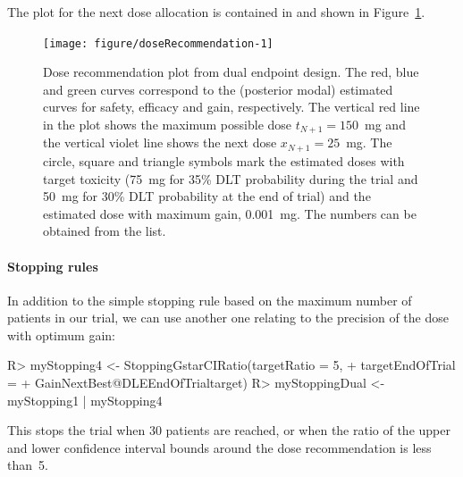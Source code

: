 \documentclass[article]{jss}\usepackage[]{graphicx}\usepackage[]{color}
\begin{document}
The plot for the next dose allocation is contained in  and shown in Figure~\ref{fig:doseRecommendation}.
\begin{figure}
\begin{Schunk}


{\centering \texttt{[image: figure/doseRecommendation-1]} 

}

\end{Schunk}
\caption{Dose recommendation plot from dual endpoint design. The red, blue and green curves correspond to the (posterior modal) estimated curves for safety, efficacy and gain, respectively. The vertical red line in the plot shows the maximum possible dose $t_{N+1} = 150$~mg and the vertical violet line shows the next dose $x_{N+1} = 25$~mg. The circle, square and triangle symbols mark the estimated doses with target toxicity (75~mg for 35\% DLT probability during the trial and 50~mg for 30\% DLT probability at the end of trial) and the estimated dose with maximum gain, 0.001~mg. The numbers can be obtained from the  list.}
\label{fig:doseRecommendation}
\end{figure}

\paragraph{Stopping rules} In addition to the simple stopping rule based on the maximum number of patients in our trial, we can use another one relating to the precision of the dose with optimum gain:
\begin{Schunk}
\begin{Sinput}
R> myStopping4 <- StoppingGstarCIRatio(targetRatio = 5,
+                                      targetEndOfTrial = 
+                                        GainNextBest@DLEEndOfTrialtarget)
R> myStoppingDual <- myStopping1 | myStopping4
\end{Sinput}
\end{Schunk}
This stops the trial when 30 patients are reached, or when the ratio of the upper and lower confidence interval bounds around the dose recommendation is less 
than~5.
\end{document}
